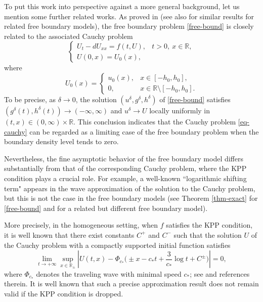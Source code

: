\documentclass[11pt]{amsart}
\numberwithin{equation}{section}
\begin{document}
To put this work into perspective against a more general background, let us mention some further related works.  
 As proved in \cite{MDW} (see also \cite{DGP,DG,D} for similar results for related free boundary models), the free boundary problem \eqref{free-bound} is closely related to the associated Cauchy problem
\begin{equation}\label{eq-cauchy}
  \begin{cases}
    U_t - dU_{xx} = f(t, U), & t > 0,~ x \in \mathbb{R}, \\
    U(0,x) = U_0(x),
  \end{cases}
\end{equation}
where
\begin{equation*}
  U_0(x) =
  \begin{cases}
    u_0(x), & x \in [-h_0, h_0], \\
    0, & x \in \mathbb{R} \setminus [-h_0, h_0].
  \end{cases}
\end{equation*}
To be precise, as \( \delta \to 0 \), the solution $(u^\delta, g^\delta, h^\delta)$ of \eqref{free-bound} satisfies  \( (g^\delta(t), h^\delta(t)) \to (-\infty, \infty) \) and \( u^\delta \to U \) locally uniformly in \( (t,x)\in(0,\infty)\times\mathbb{R} \). This conclusion indicates that the Cauchy problem \eqref{eq-cauchy} can be regarded as a limiting case of the free boundary problem when the boundary density level tends to zero. 

Nevertheless, the fine asymptotic behavior of the free boundary model differs substantially from that of the corresponding Cauchy problem, where the KPP condition plays a crucial role.  For example,
 a well-known ``logarithmic shifting term" appears in the wave approximation of the solution to the Cauchy problem, but this is not the case in the free boundary models (see Theorem \ref{thm-exact} for \eqref{free-bound} and \cite{DMZ} for a related but different free boundary model).

 More precisely,
in the homogeneous setting, when \( f \) satisfies the KPP condition, 
it is well known that there exist constants $C^+$ and $C^-$ such that the solution $U$ of the Cauchy problem with a compactly supported initial function satisfies
\[
\lim_{t \to +\infty} \sup_{x \in \mathbb R_{\pm}}
\left| U(t,x) - \Phi_{c_*}\!\Big( \pm x - c_* t + \frac{3}{c_*}\log t + C^{\pm} \Big) \right| = 0,
\]
where \( \Phi_{c_*} \) denotes the traveling wave with minimal speed \( c_* \); 
see \cite{Bramson,  HNRR, RRR} and references therein. It is well known that such a precise approximation result does not remain valid if the KPP condition is dropped.
\end{document}
